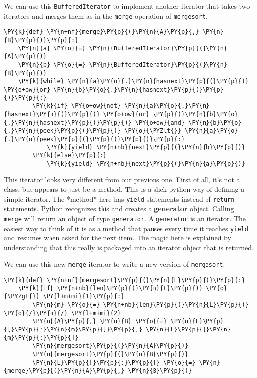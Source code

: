 We can use this \texttt{BufferedIterator} to implement another iterator that takes two iterators and merges them as in the \texttt{merge} operation of \texttt{mergesort}.

\begin{Verbatim}[commandchars=\\\{\}]
\PY{k}{def} \PY{n+nf}{merge}\PY{p}{(}\PY{n}{A}\PY{p}{,} \PY{n}{B}\PY{p}{)}\PY{p}{:}
    \PY{n}{a} \PY{o}{=} \PY{n}{BufferedIterator}\PY{p}{(}\PY{n}{A}\PY{p}{)}
    \PY{n}{b} \PY{o}{=} \PY{n}{BufferedIterator}\PY{p}{(}\PY{n}{B}\PY{p}{)}
    \PY{k}{while} \PY{n}{a}\PY{o}{.}\PY{n}{hasnext}\PY{p}{(}\PY{p}{)} \PY{o+ow}{or} \PY{n}{b}\PY{o}{.}\PY{n}{hasnext}\PY{p}{(}\PY{p}{)}\PY{p}{:}
        \PY{k}{if} \PY{o+ow}{not} \PY{n}{a}\PY{o}{.}\PY{n}{hasnext}\PY{p}{(}\PY{p}{)} \PY{o+ow}{or} \PY{p}{(}\PY{n}{b}\PY{o}{.}\PY{n}{hasnext}\PY{p}{(}\PY{p}{)} \PY{o+ow}{and} \PY{n}{b}\PY{o}{.}\PY{n}{peek}\PY{p}{(}\PY{p}{)} \PY{o}{\PYZlt{}} \PY{n}{a}\PY{o}{.}\PY{n}{peek}\PY{p}{(}\PY{p}{)}\PY{p}{)}\PY{p}{:}
            \PY{k}{yield} \PY{n+nb}{next}\PY{p}{(}\PY{n}{b}\PY{p}{)}
        \PY{k}{else}\PY{p}{:}
            \PY{k}{yield} \PY{n+nb}{next}\PY{p}{(}\PY{n}{a}\PY{p}{)}
\end{Verbatim}



This iterator looks very different from our previous one.
First of all, it's not a class, but appears to just be a method.
This is a slick python way of defining a simple iterator.
The *method* here has \texttt{yield} statements instead of \texttt{return} statements.
Python recognizes this and creates a \textbf{generator} object.
Calling \texttt{merge} will return an object of type \texttt{generator}.
A \texttt{generator} is an iterator.
The easiest way to think of it is as a method that pauses every time it reaches \texttt{yield} and resumes when asked for the next item.
The magic here is explained by understanding that this really is packaged into an iterator object that is returned.


We can use this new \texttt{merge} iterator to write a new version of \texttt{mergesort}.

\begin{Verbatim}[commandchars=\\\{\}]
\PY{k}{def} \PY{n+nf}{mergesort}\PY{p}{(}\PY{n}{L}\PY{p}{)}\PY{p}{:}
    \PY{k}{if} \PY{n+nb}{len}\PY{p}{(}\PY{n}{L}\PY{p}{)} \PY{o}{\PYZgt{}} \PY{l+m+mi}{1}\PY{p}{:}
        \PY{n}{m} \PY{o}{=} \PY{n+nb}{len}\PY{p}{(}\PY{n}{L}\PY{p}{)} \PY{o}{/}\PY{o}{/} \PY{l+m+mi}{2}
        \PY{n}{A}\PY{p}{,} \PY{n}{B} \PY{o}{=} \PY{n}{L}\PY{p}{[}\PY{p}{:}\PY{n}{m}\PY{p}{]}\PY{p}{,} \PY{n}{L}\PY{p}{[}\PY{n}{m}\PY{p}{:}\PY{p}{]}
        \PY{n}{mergesort}\PY{p}{(}\PY{n}{A}\PY{p}{)}
        \PY{n}{mergesort}\PY{p}{(}\PY{n}{B}\PY{p}{)}
        \PY{n}{L}\PY{p}{[}\PY{p}{:}\PY{p}{]} \PY{o}{=} \PY{n}{merge}\PY{p}{(}\PY{n}{A}\PY{p}{,} \PY{n}{B}\PY{p}{)}
\end{Verbatim}



